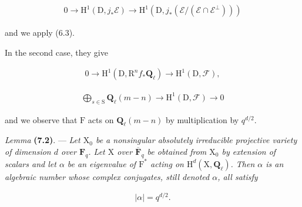 \documentclass[10pt,leqno]{article}
\begin{document}
\begin{equation*}\begin{gathered}0 \longrightarrow  \mathrm{H}^{1}(\mathrm{D},j_{*}\mathcal{E} ) \longrightarrow  \mathrm{H}^{1}(\mathrm{D},j_{*}(\mathcal{E} /(\mathcal{E} \cap \mathcal{E} ^{\perp })))\end{gathered}\tag{7.1.3′}\end{equation*}

\noindent and we apply (6.3).\par

\noindent In the second case, they give\par

\begin{equation*}\begin{gathered}0 \longrightarrow  \mathrm{H}^{1}(\mathrm{D},\mathrm{R}^{n} f_{*}\mathbf{Q}_{\ell }) \longrightarrow  \mathrm{H}^{1}(\mathrm{D},\mathcal{F} ),\end{gathered}\tag{7.1.4′}\end{equation*}

\begin{equation*}\begin{gathered}\bigoplus\limits_{s\in \mathrm{S}}\mathbf{Q}_{\ell }(m- n) \longrightarrow  \mathrm{H}^{1}(\mathrm{D},\mathcal{F} ) \longrightarrow  0\end{gathered}\tag{7.1.5′}\end{equation*}

\noindent and we observe that \(\mathrm{F}\) acts on  \(\mathbf{Q}_{\ell }(m- n)\)  by multiplication by \(q^{d/2}\).\par

\noindent \emph{Lemma} \textbf{(7.2)}. — {\itshape Let \(\mathrm{X}_{0}\) be a nonsingular absolutely irreducible projective variety of dimension \(d\) over \(\mathbf{F}_{q}\). Let \(\mathrm{X}\) over \(\overline{\mathbf{F}}_{q}\) be obtained from \(\mathrm{X}_{0}\) by extension of scalars and let \(\alpha \) be an eigenvalue of \(\mathrm{F}^{*}\) acting on \(\mathrm{H}^{d}(\mathrm{X},\mathbf{Q}_{\ell })\). Then \(\alpha \) is an algebraic number whose complex conjugates, still denoted \(\alpha \), all satisfy}\par

\begin{equation*}\begin{gathered}|\alpha |=q^{d/2}.\end{gathered}\end{equation*}

\clearpage
\end{document}
